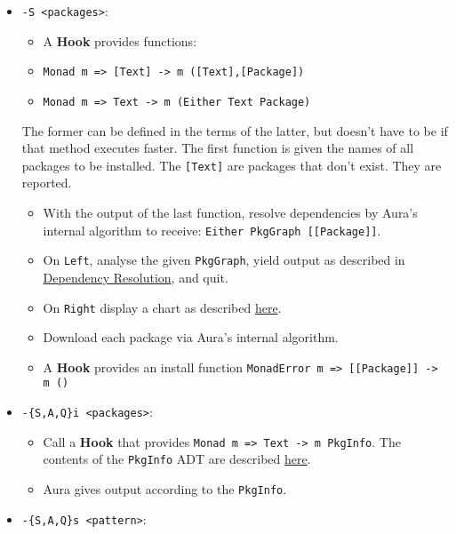 \documentclass{article}
\begin{document}
\begin{itemize}
\itemsep1pt\parskip0pt
\item
  \texttt{-S \textless{}packages\textgreater{}}:

  \begin{itemize}
  \itemsep1pt\parskip0pt
  \item
    A \textbf{Hook} provides functions:
  \item
    \texttt{Monad m =\textgreater{} {[}Text{]} -\textgreater{} m ({[}Text{]},{[}Package{]})}
  \item
    \texttt{Monad m =\textgreater{} Text -\textgreater{} m (Either Text Package)}
  \end{itemize}

  The former can be defined in the terms of the latter, but doesn't have
  to be if that method executes faster. The first function is given the
  names of all packages to be installed. The \texttt{{[}Text{]}} are
  packages that don't exist. They are reported.

  \begin{itemize}
  \itemsep1pt\parskip0pt
  \item
    With the output of the last function, resolve dependencies by Aura's
    internal algorithm to receive:
    \texttt{Either PkgGraph {[}{[}Package{]}{]}}.
  \item
    On \texttt{Left}, analyse the given \texttt{PkgGraph}, yield output
    as described in \href{/DESIGN.md\#dependency-resolution}{Dependency
    Resolution}, and quit.
  \item
    On \texttt{Right} display a chart as described
    \href{/DESIGN.md\#version-information-when-upgrading}{here}.
  \item
    Download each package via Aura's internal algorithm.
  \item
    A \textbf{Hook} provides an install function
    \texttt{MonadError m =\textgreater{} {[}{[}Package{]}{]} -\textgreater{}   m ()}
  \end{itemize}
\item
  \texttt{-\{S,A,Q\}i \textless{}packages\textgreater{}}:

  \begin{itemize}
  \itemsep1pt\parskip0pt
  \item
    Call a \textbf{Hook} that provides
    \texttt{Monad m =\textgreater{} Text -\textgreater{} m PkgInfo}. The
    contents of the \texttt{PkgInfo} ADT are described
    \href{/DESIGN.md\#pkginfo}{here}.
  \item
    Aura gives output according to the \texttt{PkgInfo}.
  \end{itemize}
\item
  \texttt{-\{S,A,Q\}s \textless{}pattern\textgreater{}}:


\end{itemize}
\end{document}
